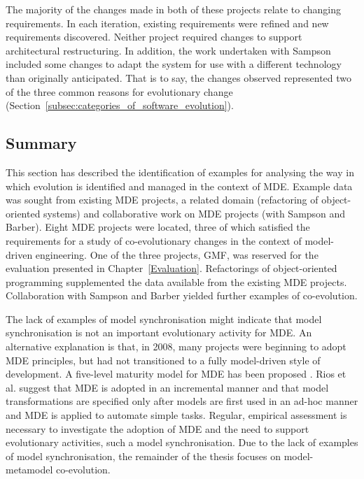 The majority of the changes made in both of these projects relate to changing requirements. In each iteration, existing requirements were refined and new requirements discovered. Neither project required changes to support architectural restructuring. In addition, the work undertaken with Sampson included some changes to adapt the system for use with a different technology than originally anticipated. That is to say, the changes observed represented two of the three common reasons for evolutionary change (Section~\ref{subsec:categories_of_software_evolution}). 


\subsection{Summary}
This section has described the identification of examples for analysing the way in which evolution is identified and managed in the context of MDE. Example data was sought from existing MDE projects, a related domain (refactoring of object-oriented systems) and collaborative work on MDE projects (with Sampson and Barber). Eight MDE projects were located, three of which satisfied the requirements for a study of co-evolutionary changes in the context of model-driven engineering. One of the three projects, GMF, was reserved for the evaluation presented in Chapter~\ref{Evaluation}. Refactorings of object-oriented programming supplemented the data available from the existing MDE projects. Collaboration with Sampson and Barber yielded further examples of co-evolution.

The lack of examples of model synchronisation might indicate that model synchronisation is not an important evolutionary activity for MDE. An alternative explanation is that, in 2008, many projects were beginning to adopt MDE principles, but had not transitioned to a fully model-driven style of development. A \cc five-level maturity model for MDE has been proposed \cite{rios06mdd_maturity}. Rios et al. suggest that MDE is adopted in an incremental manner and that model transformations are specified only after models are first used in an ad-hoc manner and MDE is applied to automate simple tasks. Regular, empirical assessment is necessary to investigate the adoption of MDE and the need to support evolutionary activities, such a model synchronisation. Due to the lack of examples of model synchronisation, the remainder of the thesis focuses on model-metamodel co-evolution.

